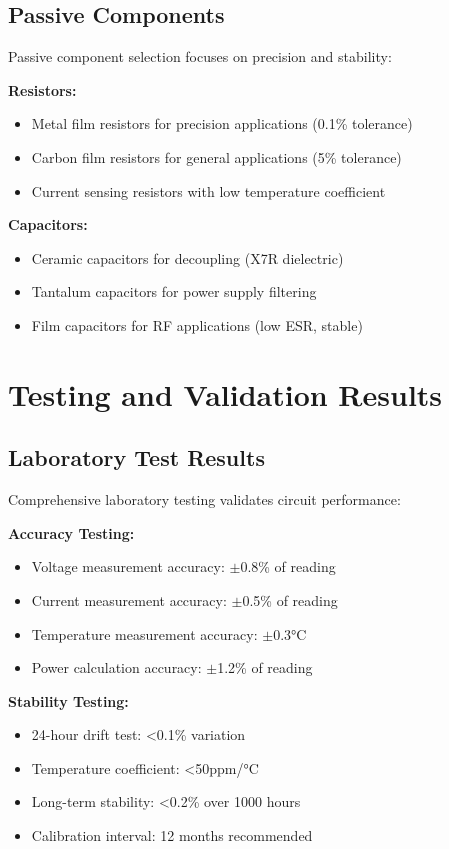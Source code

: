 \subsection{Passive Components}
\label{subsec:passive_components}

Passive component selection focuses on precision and stability:

\textbf{Resistors:}
\begin{itemize}
\item Metal film resistors for precision applications (0.1\% tolerance)
\item Carbon film resistors for general applications (5\% tolerance)
\item Current sensing resistors with low temperature coefficient
\end{itemize}

\textbf{Capacitors:}
\begin{itemize}
\item Ceramic capacitors for decoupling (X7R dielectric)
\item Tantalum capacitors for power supply filtering
\item Film capacitors for RF applications (low ESR, stable)
\end{itemize}

\section{Testing and Validation Results}
\label{sec:testing_results}

\subsection{Laboratory Test Results}
\label{subsec:lab_test_results}

Comprehensive laboratory testing validates circuit performance:

\textbf{Accuracy Testing:}
\begin{itemize}
\item Voltage measurement accuracy: $\pm$0.8\% of reading
\item Current measurement accuracy: $\pm$0.5\% of reading
\item Temperature measurement accuracy: $\pm$0.3°C
\item Power calculation accuracy: $\pm$1.2\% of reading
\end{itemize}

\textbf{Stability Testing:}
\begin{itemize}
\item 24-hour drift test: <0.1\% variation
\item Temperature coefficient: <50ppm/°C
\item Long-term stability: <0.2\% over 1000 hours
\item Calibration interval: 12 months recommended
\end{itemize}


